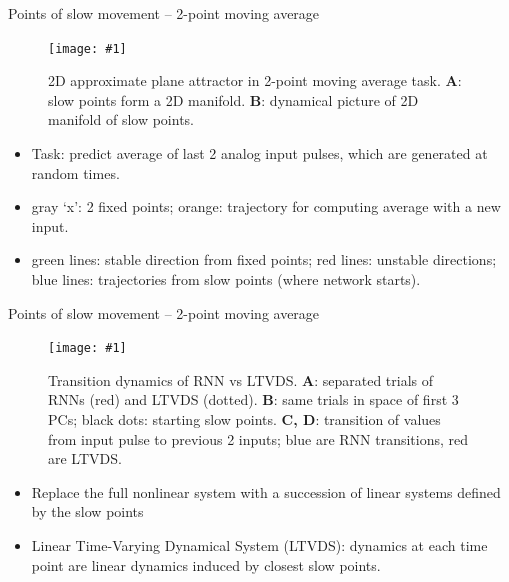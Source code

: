 \documentclass[9pt]{beamer}
\newcommand{\picHereWidth}[4] { %
    \begin{figure}[htp] %
        \centering
        \texttt{[image: \#1]} %
        \caption{#2} %
        \label{#3}
    \end{figure} %
}
\begin{document}
\begin{frame}{Points of slow movement -- 2-point moving average}
    \picHereWidth{../images/sussilo13-fig7_movingavg.png}{2D approximate plane attractor in 2-point moving average task. \textbf{A}: slow points form a 2D manifold. \textbf{B}: dynamical picture of 2D manifold of slow points.}{fig:sine_gen}{0.68\linewidth}
    \begin{itemize}
        \item Task: predict average of last 2 analog input pulses, which are generated at random times.
        \item gray `x': 2 fixed points; orange: trajectory for computing average with a new input.
        \item green lines: stable direction from fixed points; red lines: unstable directions; blue lines: trajectories from slow points (where network starts).
    \end{itemize}

\end{frame}

\begin{frame}{Points of slow movement -- 2-point moving average}
    \picHereWidth{../images/sussilo13-fig8_movingavg.png}{Transition dynamics of RNN vs LTVDS. \textbf{A}: separated trials of RNNs (red) and LTVDS (dotted). \textbf{B}: same trials in space of first 3 PCs; black dots: starting slow points. \textbf{C, D}: transition of values from input pulse to previous 2 inputs; blue are RNN transitions, red are LTVDS.}{fig:sine_gen}{0.5\linewidth}
    \begin{itemize}
        \item Replace the full nonlinear system with a succession of linear systems defined by
        the slow points
        \item Linear Time-Varying Dynamical System (LTVDS): dynamics at each time point are linear dynamics induced by closest slow points.
    \end{itemize}

\end{frame}

\end{document}
